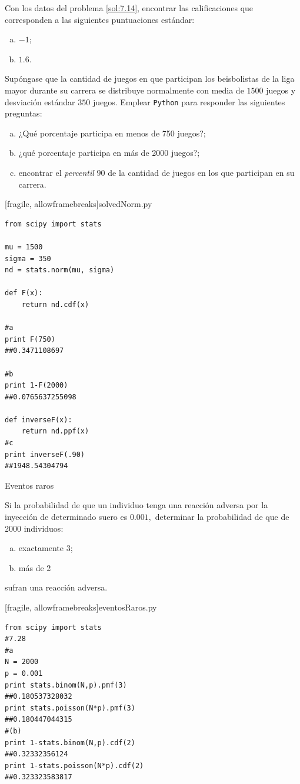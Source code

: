  \begin{ejemplo}
  \label{sol:7.15}
  Con los datos del problema \ref{sol:7.14}, encontrar las calificaciones que corresponden a las siguientes puntuaciones estándar:
  \begin{enumerate}[(a)]
   \item $-1$;
   \item $1.6$.
  \end{enumerate}

 \end{ejemplo}



 \begin{ejemplo}
  \label{sol:7.16}
  Supóngase que la cantidad de juegos en que participan los beisbolistas de la liga mayor durante su carrera se distribuye normalmente con media de $1500$ juegos y desviación estándar $350$ juegos. Emplear \texttt{Python} para responder las siguientes preguntas:
  \begin{enumerate}[(a)]
   \item ¿Qué porcentaje participa en menos de 750 juegos?;
   \item ¿qué porcentaje participa en más de 2000 juegos?;
   \item encontrar el \emph{percentil} $90$ de la cantidad de juegos en los que participan en su carrera.
  \end{enumerate}

 \end{ejemplo}


[fragile, allowframebreaks]{solvedNorm.py}
 \begin{verbatim}
from scipy import stats

mu = 1500
sigma = 350
nd = stats.norm(mu, sigma)

def F(x):
    return nd.cdf(x)

#a
print F(750)
##0.3471108697

#b
print 1-F(2000)
##0.0765637255098

def inverseF(x):
    return nd.ppf(x)
#c
print inverseF(.90)
##1948.54304794
 \end{verbatim}


{Eventos raros}
\begin{ejemplo}
\label{sol:7.28}
  Si la probabilidad de que un individuo tenga una reacción adversa por la inyección de determinado suero es $0.001,$ determinar la probabilidad de que de 2000 individuos:
 \begin{enumerate}[(a)]
  \item exactamente 3;
  \item más de 2
 \end{enumerate}
sufran una reacción adversa.
\end{ejemplo}


[fragile, allowframebreaks]{eventosRaros.py}
 \begin{verbatim}
from scipy import stats
#7.28
#a
N = 2000
p = 0.001
print stats.binom(N,p).pmf(3)
##0.180537328032
print stats.poisson(N*p).pmf(3)
##0.180447044315
#(b)
print 1-stats.binom(N,p).cdf(2)
##0.32332356124
print 1-stats.poisson(N*p).cdf(2)
##0.323323583817
 \end{verbatim}


